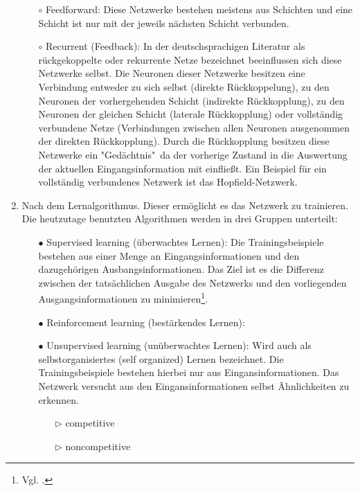 \begin{enumerate}
\begin{itemize}
\item[$\circ$]%
Feedforward: Diese Netzwerke bestehen meistens aus Schichten und eine Schicht ist nur mit der jeweils nächsten Schicht verbunden.

\item[$\circ$]%
Recurrent (Feedback): In der deutschsprachigen Literatur als rückgekoppelte oder rekurrente Netze bezeichnet beeinflussen sich diese Netzwerke selbst. Die Neuronen dieser Netzwerke besitzen eine Verbindung entweder zu sich selbst (direkte Rückkoppelung), zu den Neuronen der vorhergehenden Schicht (indirekte Rückkopplung), zu den Neuronen der gleichen Schicht (laterale Rückkopplung) oder vollständig verbundene Netze (Verbindungen zwischen allen Neuronen ausgenommen der direkten Rückkopplung). Durch die Rückkopplung besitzen diese Netzwerke ein "Gedächtnis"~da der vorherige Zustand in die Auswertung der aktuellen Eingangsinformation mit einfließt. Ein Beispiel für ein vollständig verbundenes Netzwerk ist das Hopfield-Netzwerk.

\end{itemize}

\item%
Nach dem Lernalgorithmus. Dieser ermöglicht es das Netzwerk zu trainieren. Die heutzutage benutzten Algorithmen werden in drei Gruppen unterteilt:

\begin{itemize}
\item[\textbf{$\bullet$}]%
Supervised learning (überwachtes Lernen): Die Trainingsbeispiele bestehen aus einer Menge an Eingangsinformationen und den dazugehörigen Ausbangsinformationen. Das Ziel ist es die Differenz zwischen der tatsächlichen Ausgabe des Netzwerks und den vorliegenden Ausgangsinformationen zu minimieren\footnote{Vgl. \citet[55]{dkriesel07}.\label{kriesel55}}.

\item[\textbf{$\bullet$}]%
Reinforcement learning (bestärkendes Lernen):

\item[\textbf{$\bullet$}]%
Unsupervised learning (unüberwachtes Lernen): Wird auch als selbstorganisiertes (self organized) Lernen bezeichnet. Die Trainingsbeispiele bestehen hierbei nur aus Eingansinformationen. Das Netzwerk versucht aus den Eingansinformationen selbst Ähnlichkeiten zu erkennen.
\begin{itemize}
\item[\textbf{$\triangleright$}]%
competitive
\item[\textbf{$\triangleright$}]%
noncompetitive
\end{itemize}


\end{itemize}
\end{enumerate}
